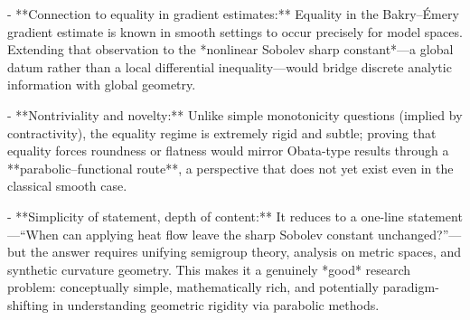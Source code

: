- **Connection to equality in gradient estimates:** Equality in the Bakry–Émery gradient estimate is known in smooth settings to occur precisely for model spaces. Extending that observation to the *nonlinear Sobolev sharp constant*—a global datum rather than a local differential inequality—would bridge discrete analytic information with global geometry.  

- **Nontriviality and novelty:** Unlike simple monotonicity questions (implied by contractivity), the equality regime is extremely rigid and subtle; proving that equality forces roundness or flatness would mirror Obata-type results through a **parabolic–functional route**, a perspective that does not yet exist even in the classical smooth case.  

- **Simplicity of statement, depth of content:** It reduces to a one-line statement—“When can applying heat flow leave the sharp Sobolev constant unchanged?”—but the answer requires unifying semigroup theory, analysis on metric spaces, and synthetic curvature geometry. This makes it a genuinely *good* research problem: conceptually simple, mathematically rich, and potentially paradigm-shifting in understanding geometric rigidity via parabolic methods.